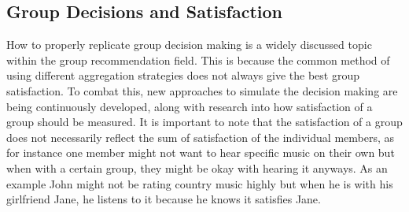 \subsection{Group Decisions and Satisfaction}
How to properly replicate group decision making is a widely discussed topic within the group recommendation field. This is because the common method of using different aggregation strategies does not always give the best group satisfaction\cite{aggregationnotenough}. To combat this, new approaches to simulate the decision making are being continuously developed, along with research into how satisfaction of a group should be measured. It is important to note that the satisfaction of a group does not necessarily reflect the sum of satisfaction of the individual members, as for instance one member might not want to hear specific music on their own but when with a certain group, they might be okay with hearing it anyways. As an example John might not be rating country music highly but when he is with his girlfriend Jane, he listens to it because he knows it satisfies Jane.

